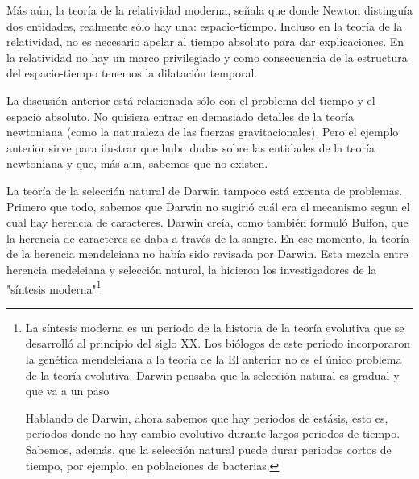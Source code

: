 {{{{%
Más aún, la teoría de la relatividad moderna, señala que donde Newton distinguía dos entidades, realmente sólo hay una: espacio-tiempo.
Incluso en la teoría de la relatividad, no es necesario apelar al tiempo absoluto para dar explicaciones.
En la relatividad no hay un marco privilegiado y como consecuencia de la estructura del espacio-tiempo tenemos la dilatación temporal.

La discusión anterior está relacionada sólo con el problema del tiempo y el espacio absoluto.
No quisiera entrar en demasiado detalles de la teoría newtoniana (como la naturaleza de las fuerzas gravitacionales).
Pero el ejemplo anterior sirve para ilustrar que hubo dudas sobre las entidades de la teoría newtoniana y que, más aun, sabemos que no existen.

La teoría de la selección natural de Darwin tampoco está excenta de problemas.
Primero que todo, sabemos que Darwin no sugirió cuál era el mecanismo segun el cual hay herencia de caracteres.
Darwin creía, como también formuló Buffon, que la herencia de caracteres se daba a través de la sangre.
En ese momento, la teoría de la herencia mendeleiana no había sido revisada por Darwin.
Esta mezcla entre herencia medeleiana y selección natural, la hicieron los investigadores de la "síntesis moderna"\footnote{La síntesis moderna es un periodo de la historia de la teoría evolutiva que se desarrolló al principio del siglo XX. Los biólogos de este periodo incorporaron la genética mendeleiana a la teoría de la %
El anterior no es el único problema de la teoría evolutiva.
Darwin pensaba que la selección natural es gradual y que va a un paso %

Hablando de Darwin, ahora sabemos que hay periodos de estásis, esto es, periodos donde no hay cambio evolutivo durante largos periodos de tiempo.
Sabemos, además, que la selección natural puede durar periodos cortos de tiempo, por ejemplo, en poblaciones de bacterias.

}}}}}
